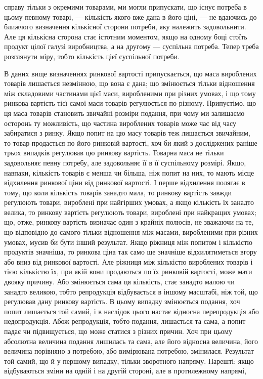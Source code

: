 \parcont{}  %
справу тільки з окремими товарами, ми могли припускати, що
існує потреба в цьому певному товарі, — кількість якого вже
дана в його ціні, — не вдаючись до ближчого визначення кількісної сторони потреби, яку належить
задовольнити. Але ця
кількісна сторона стає істотним моментом, якщо на одному боці
стоїть продукт цілої галузі виробництва, а на другому — суспільна потреба. Тепер треба розглянути
міру, тобто кількість цієї суспільної потреби.

В даних вище визначеннях ринкової вартості припускається,
що маса вироблених товарів лишається незмінною, що вона
є дана; що змінюється тільки відношення між складовими частинами цієї маси, виробленими при різних
умовах, і що тому
ринкова вартість тієї самої маси товарів регулюється по-різному.
Припустімо, що ця маса товарів становить звичайні розміри
подання, при чому ми залишаємо осторонь ту можливість, що
частина вироблених товарів може час від часу забиратися
з ринку. Якщо попит на цю масу товарів теж лишається звичайним, то товар продається по його ринковій
вартості, хоч би
який з досліджених раніше трьох випадків регулював цю ринкову вартість. Товарна маса не тільки
задовольняє певну потребу, але задовольняє її в її суспільному розмірі. Якщо, навпаки, кількість
товарів є менша чи більша, ніж попит на них,
то мають місце відхилення ринкової ціни від ринкової вартості.
І перше відхилення полягає в тому, що коли кількість товарів
занадто мала, то ринкову вартість завжди регулюють товари,
вироблені при найгірших умовах, а якщо кількість їх занадто
велика, то ринкову вартість регулюють товари, вироблені при
найкращих умовах; що, отже, ринкову вартість визначає один
з крайніх полюсів, не зважаючи на те, що відповідно до самого
тільки відношення між масами, виробленими при різних умовах,
мусив би бути інший результат. Якщо ріжниця між попитом
і кількістю продуктів значніша, то ринкова ціна так само ще
значніше відхилятиметься вгору або вниз від ринкової вартості.
Але ріжниця між кількістю вироблених товарів і тією кількістю
їх, при якій вони продаються по їх ринковій вартості, може
мати двояку причину. Або змінюється сама ця кількість, стає
занадто малою чи занадто великою, тобто репродукція відбувається в іншому масштабі, ніж той, що
регулював дану
ринкову вартість. В цьому випадку змінюється подання, хоч
попит лишається той самий, і в наслідок цього настає відносна
перепродукція або недопродукція. Абож репродукція, тобто
подання, лишається та сама, а попит падає чи підвищується,
що може статися з різних причин. Хоч при цьому абсолютна
величина подання лишилась та сама, але його відносна величина,
його величина порівняно з потребою, або вимірювана потребою,
змінилася. Результат той самий, що й у першому випадку,
тільки зворотного напряму. Нарешті: якщо відбуваються зміни
на одній і на другій стороні, але в протилежному напрямі,
\parbreak{}  %
